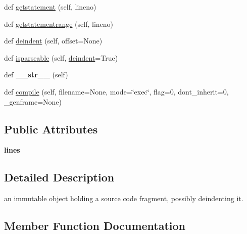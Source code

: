 \begin{DoxyCompactItemize}
\item 
def \hyperlink{class__pytest_1_1__code_1_1source_1_1_source_a6e6af6b03c2af23ce350634fdb4770c1}{getstatement} (self, lineno)
\item 
def \hyperlink{class__pytest_1_1__code_1_1source_1_1_source_a922e58f496eeacb6b757d222c5836c25}{getstatementrange} (self, lineno)
\item 
def \hyperlink{class__pytest_1_1__code_1_1source_1_1_source_a732b2d5134294e24d929b03050665c78}{deindent} (self, offset=None)
\item 
def \hyperlink{class__pytest_1_1__code_1_1source_1_1_source_a91c09b329d66eb3596c02a4641e4070c}{isparseable} (self, \hyperlink{class__pytest_1_1__code_1_1source_1_1_source_a732b2d5134294e24d929b03050665c78}{deindent}=True)
\item 
\mbox{\label{class__pytest_1_1__code_1_1source_1_1_source_a1e65ccb67067a2ec614d299ff91eefa3}} 
def {\bfseries \+\_\+\+\_\+str\+\_\+\+\_\+} (self)
\item 
def \hyperlink{class__pytest_1_1__code_1_1source_1_1_source_ab577be6088a1d1e4f75cbd2b68bd5e66}{compile} (self, filename=None, mode=\char`\"{}exec\char`\"{}, flag=0, dont\+\_\+inherit=0, \+\_\+genframe=None)
\end{DoxyCompactItemize}
\subsection*{Public Attributes}
\begin{DoxyCompactItemize}
\item 
\mbox{\label{class__pytest_1_1__code_1_1source_1_1_source_a9d6acf9f5070717049230392557db66a}} 
{\bfseries lines}
\end{DoxyCompactItemize}


\subsection{Detailed Description}
\begin{DoxyVerb}an immutable object holding a source code fragment,
    possibly deindenting it.
\end{DoxyVerb}
 

\subsection{Member Function Documentation}
\mbox{\label{class__pytest_1_1__code_1_1source_1_1_source_ab577be6088a1d1e4f75cbd2b68bd5e66}} 
